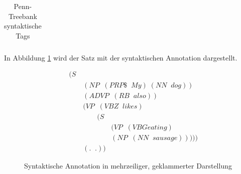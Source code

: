 \begin{table}
\begin{tabular}{ | l p{7cm} p{4cm} |}
	\hline
\end{tabular}
\caption{Penn-Treebank syntaktische Tags \cite{penntagsetAusfuehrlich}} %
\label{tab:phrase-tags}
\end{table}
In Abbildung \ref{fig:multiline-annotated-dog-eating} wird der Satz mit der syntaktischen Annotation dargestellt.

\begin{figure}
\begin{align}
&(S \nonumber \\ 
& \qquad (NP \;\;(PRP\$ \;\; My)\; (NN \;\; dog)) \nonumber \\
& \qquad (ADVP \;\;(RB \;\; also)) \nonumber \\
& \qquad (VP \;\;(VBZ \;\; likes) \nonumber \\
& \qquad \qquad (S \nonumber \\
& \qquad \qquad \qquad (VP \;\;(VBG eating) \nonumber \\
& \qquad \qquad \qquad (NP \;\;(NN \;\; sausage)))))\nonumber \\
& \qquad (. \;\; .)) \nonumber
\end{align}
\label{fig:multiline-annotated-dog-eating}
\caption{Syntaktische Annotation in mehrzeiliger, geklammerter Darstellung}
\end{figure}

